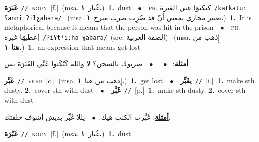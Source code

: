 \documentclass[10pt,a4paper,twoside]{article} %
\begin{document}
\begin{multicols}{2}
{{\setlength\topsep{0pt}\textbf{\foreignlanguage{arabic}{غَبَرَة}}\ {\color{gray}\texttt{//}\color{black}}\ \textsc{noun}\ [f.]\ \color{gray}(msa. \foreignlanguage{arabic}{غُبار}~\foreignlanguage{arabic}{\textbf{١.}})\color{black}\ \textbf{1.}~dust\ \ $\bullet$\ \ \textsc{ph.} \color{gray} \foreignlanguage{arabic}{كتكتوَا عني الغبرة}\color{black}\ {\color{gray}\texttt{/{\sffamily katkatuː ʕanni ʔilɣabara}/}\color{black}}\ \color{gray} (msa. \foreignlanguage{arabic}{تعبير مجازي بمعني أنّ قد ضُرِب ضرب مبرح}~\foreignlanguage{arabic}{\textbf{١.}})\color{black}\ \textbf{1.}~It is metaphorical because it means that the person was hit in the prison\ \ $\bullet$\ \ \textsc{ph.} \color{gray} \foreignlanguage{arabic}{اِعطيهَا غبرة}\color{black}\ {\color{gray}\texttt{/{\sffamily ʔiʕtˤiːha ɣabara}/}\color{black}}\ \color{gray}(src. \foreignlanguage{arabic}{الضفة الغربية})\color{black}\ \color{gray} (msa. \foreignlanguage{arabic}{إِذهب من هنا}~\foreignlanguage{arabic}{\textbf{١.}})\color{black}\ \textbf{1.}~an expression that means get lost\  \begin{flushright}\color{gray}\foreignlanguage{arabic}{\textbf{\underline{\foreignlanguage{arabic}{أمثلة}}}: \ $\bullet$\ \  \ $\bullet$\ \  ضربوك بالسجن؟ لا والله كَتْكَتوا عَنِّي الغَبَرَة بس}\end{flushright}\color{black}} \vspace{2mm}

{\setlength\topsep{0pt}\textbf{\foreignlanguage{arabic}{غَبِّر}}\ {\color{gray}\texttt{//}\color{black}}\ \textsc{verb}\ [c.]\ \color{gray}(msa. \foreignlanguage{arabic}{إِذهب من هنا}~\foreignlanguage{arabic}{\textbf{١.}})\color{black}\ \textbf{1.}~get lost\ \ $\bullet$\ \ \setlength\topsep{0pt}\textbf{\foreignlanguage{arabic}{يغَبِّر}}\ {\color{gray}\texttt{//}\color{black}}\ [i.]\ \textbf{1.}~make sth dusty.  \textbf{2.}~cover sth with dust\ \ $\bullet$\ \ \setlength\topsep{0pt}\textbf{\foreignlanguage{arabic}{غَبَّر}}\ {\color{gray}\texttt{//}\color{black}}\ [p.]\ \textbf{1.}~make sth dusty.  \textbf{2.}~cover sth with dust\  \begin{flushright}\color{gray}\foreignlanguage{arabic}{\textbf{\underline{\foreignlanguage{arabic}{أمثلة}}}: غَبَّرت الكنب هيك.\ $\bullet$\ \  يللا غَبِّر بديش أشوف خلقتك.}\end{flushright}\color{black}} \vspace{2mm}

{\setlength\topsep{0pt}\textbf{\foreignlanguage{arabic}{غَبْرَة}}\ {\color{gray}\texttt{//}\color{black}}\ \textsc{noun}\ [f.]\ \color{gray}(msa. \foreignlanguage{arabic}{غُبار}~\foreignlanguage{arabic}{\textbf{١.}})\color{black}\ \textbf{1.}~dust\ 

}}
\end{multicols}
\end{document}
